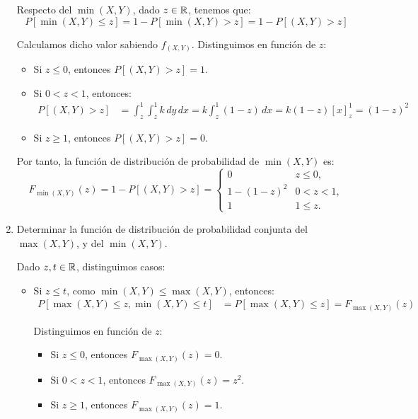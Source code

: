 \begin{ejercicio}
\begin{enumerate}
        Respecto del $\min(X,Y)$, dado $z\in \mathbb{R}$, tenemos que:
        \begin{equation*}
            P[\min(X,Y)\leq z]=1-P[\min(X,Y)>z]=1-P[(X,Y)>z]
        \end{equation*}

        Calculamos dicho valor sabiendo $f_{(X,Y)}$. Distinguimos en función de $z$:
        \begin{itemize}
            \item Si $z\leq 0$, entonces $P[(X,Y)>z]=1$.

            \item Si $0<z<1$, entonces:
            \begin{align*}
                P[(X,Y)>z]&=\int_{z}^{1}\int_{z}^{1} k \, dy \, dx = k\int_{z}^{1} (1-z) \, dx
                = k(1-z)\left[x\right]_{z}^{1} = (1-z)^2
            \end{align*}

            \item Si $z\geq 1$, entonces $P[(X,Y)>z]=0$.
        \end{itemize}

        Por tanto, la función de distribución de probabilidad de $\min(X,Y)$ es:
        \begin{equation*}
            F_{\min(X,Y)}(z) = 1-P[(X,Y)>z]=\begin{cases}
                0 & z\leq 0, \\
                1-(1-z)^2 & 0<z<1, \\
                1 & 1\leq z.
            \end{cases}
        \end{equation*}

        \item Determinar la función de distribución de probabilidad conjunta del $\max(X,Y)$, y del $\min(X,Y)$.
        
        Dado $z,t\in \mathbb{R}$, distinguimos casos:
        \begin{itemize}
            \item Si $z\leq t$, como $\min (X,Y)\leq \max(X,Y)$, entonces:
            \begin{align*}
                P[\max(X,Y)\leq z,\min(X,Y)\leq t]&=P[\max(X,Y)\leq z] = F_{\max(X,Y)}(z)
            \end{align*}

            Distinguimos en función de $z$:
            \begin{itemize}
                \item Si $z\leq 0$, entonces $F_{\max(X,Y)}(z)=0$.
                \item Si $0<z<1$, entonces $F_{\max(X,Y)}(z)=z^2$.
                \item Si $z\geq 1$, entonces $F_{\max(X,Y)}(z)=1$.
            \end{itemize}


\end{itemize}
\end{enumerate}
\end{ejercicio}
